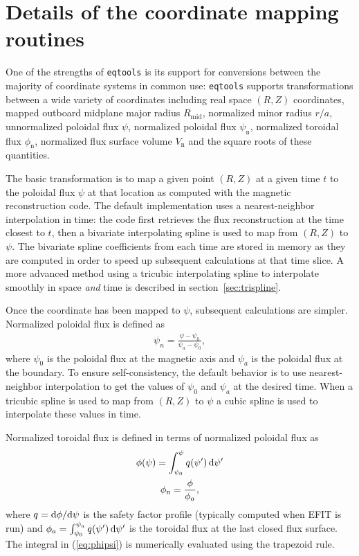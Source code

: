 \documentclass[12pt,floatfix,showpacs]{revtex4-1}
\newcommand{\diff}{\ensuremath\mathrm{d}}
\newcommand{\gnote}[1]{\marginpar{\scriptsize\textcolor{red}{#1}}}
\newcommand{\eqtools}{\texttt{eqtools}\xspace}
\begin{document}
\section{Details of the coordinate mapping routines}\label{sec:algo}
One of the strengths of \eqtools is its support for conversions between the majority of coordinate systems in common use:
\eqtools supports transformations between a wide variety of coordinates including real space $(R, Z)$ coordinates, mapped outboard midplane major radius $R_{\text{mid}}$, normalized minor radius $r/a$, unnormalized poloidal flux $\psi$, normalized poloidal flux $\psi_{\text{n}}$, normalized toroidal flux $\phi_{\text{n}}$, normalized flux surface volume $V_{\text{n}}$ and the square roots of these quantities.\gnote{John, not sure what more breakdown you want here. Please clarify your comments.}

The basic transformation is to map a given point $(R, Z)$ at a given time $t$ to the poloidal flux $\psi$ at that location as computed with the magnetic reconstruction code.
The default implementation uses a nearest-neighbor interpolation in time: the code first retrieves the flux reconstruction at the time closest to $t$, then a bivariate interpolating spline \cite{dierckxBook,scipy} is used to map from $(R, Z)$ to $\psi$.
The bivariate spline coefficients from each time are stored in memory as they are computed in order to speed up subsequent calculations at that time slice.
A more advanced method using a tricubic interpolating spline to interpolate smoothly in space \emph{and} time is described in section~\ref{sec:trispline}.

Once the coordinate has been mapped to $\psi$, subsequent calculations are simpler.
Normalized poloidal flux is defined as
\begin{gather}
	\psi_{n} = \frac{\psi - \psi_{0}}{\psi_{a} - \psi_{0}},
\end{gather}
where $\psi_{0}$ is the poloidal flux at the magnetic axis and $\psi_{a}$ is the poloidal flux at the boundary.
To ensure self-consistency, the default behavior is to use nearest-neighbor interpolation to get the values of $\psi_{0}$ and $\psi_{a}$ at the desired time.
When a tricubic spline is used to map from $(R, Z)$ to $\psi$ a cubic spline is used to interpolate these values in time.

Normalized toroidal flux is defined in terms of normalized poloidal flux as
\begin{gather}
	\phi(\psi) = \int_{\psi_{0}}^{\psi} q(\psi')\,\diff\psi'\label{eq:phipsi}\\
	\phi_{\text{n}} = \frac{\phi}{\phi_{a}},
\end{gather}
where $q = \diff\phi/\diff\psi$ is the safety factor profile (typically computed when EFIT is run) and $\phi_{a}=\int_{\psi_{0}}^{\psi_{a}}q(\psi')\,\diff\psi'$ is the toroidal flux at the last closed flux surface.
The integral in (\ref{eq:phipsi}) is numerically evaluated using the trapezoid rule.
\end{document}
